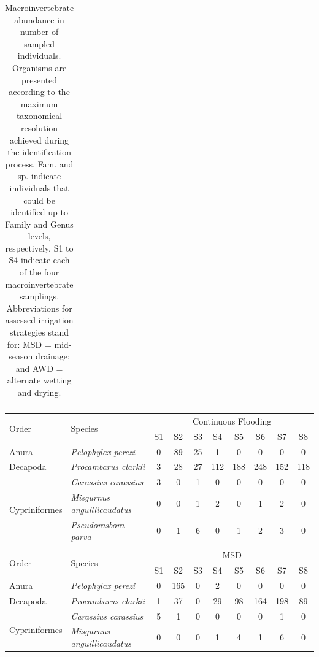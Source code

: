 \begin{table} [htbp]
\begin{tabular}{l | l | c c c c | c c c c | c c c c}
    \cline{1-14}
    \end{tabular}
    \caption{Macroinvertebrate abundance in number of sampled individuals. Organisms are presented according to the maximum taxonomical resolution achieved during the identification process. Fam. and sp. indicate individuals that could be identified up to Family and Genus levels, respectively. S1 to S4 indicate each of the four macroinvertebrate samplings. Abbreviations for assessed irrigation strategies stand for: MSD = mid-season drainage; and AWD = alternate wetting and drying.}
    \label{AbuColOdoHet}
\end{table}


\begin{table} [htbp]
    \centering
    \scriptsize  
    \begin{tabular}{l | l | c c c c c c c c }
\cline{1-10}
\multirow{2}{2.3cm}{Order} & \multirow{2}{3cm}{Species} & \multicolumn{8}{c}{Continuous Flooding} \\
    \cline{3-10}
& & S1 & S2 & S3 & S4 & S5 & S6 & S7 & S8 \\
    \cline{1-10}
Anura & \textit{Pelophylax perezi} & 0 & 89 & 25 & 1 & 0 & 0 & 0 & 0\\
    \cline{1-10}
Decapoda & \textit{Procambarus clarkii} & 3 & 28 & 27 & 112 & 188 & 248 & 152 & 118\\
    \cline{1-10}
\multirow{3}{2.3cm}{Cypriniformes} & \textit{Carassius carassius} & 3 & 0 & 1 & 0 & 0 & 0 & 0 & 0\\
  & \textit{Misgurnus anguillicaudatus} & 0 & 0 & 1 & 2 & 0 & 1 & 2 & 0\\
& \textit{Pseudorasbora parva} & 0 & 1 & 6 & 0 & 1 & 2 & 3 & 0\\
    \cline{1-10} 
\multicolumn{10}{c}{} \\
     \cline{1-10}
\multirow{2}{2.3cm}{Order} & \multirow{2}{3cm}{Species} & \multicolumn{8}{c}{MSD} \\
    \cline{3-10}
& & S1 & S2 & S3 & S4 & S5 & S6 & S7 & S8 \\
    \cline{1-10}
Anura & \textit{Pelophylax perezi} & 0 & 165 & 0 & 2 & 0 & 0 & 0 & 0\\
    \cline{1-10}
Decapoda & \textit{Procambarus clarkii} & 1 & 37 & 0 & 29 & 98 & 164 & 198 & 89\\
    \cline{1-10}
\multirow{3}{2.3cm}{Cypriniformes} & \textit{Carassius carassius} & 5 & 1 & 0 & 0 & 0 & 0 & 1 & 0\\
  & \textit{Misgurnus anguillicaudatus} & 0 & 0 & 0 & 1 & 4 & 1 & 6 & 0\\

\end{tabular}
\end{table}
